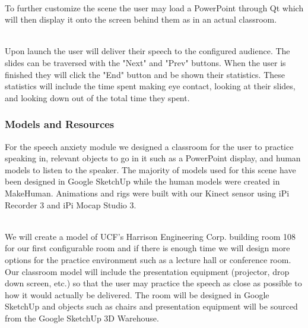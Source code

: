 \documentclass[a4paper,10pt]{article}
\begin{document}
\par~\\
To further customize the scene the user may load a PowerPoint through Qt which will then display it onto the screen behind them as in an actual classroom.

\par~\\
Upon launch the user will deliver their speech to the configured audience. The slides can be traversed with the "Next" and "Prev" buttons. When the user is finished they will click the "End" button and be shown their statistics. These statistics will include the time spent making eye contact, looking at their slides, and looking down out of the total time they spent.

\subsubsection{Models and Resources}
For the speech anxiety module we designed a classroom for the user to practice speaking in, relevant objects to go in it such as a PowerPoint display, and human models to listen to the speaker. The majority of models used for this scene have been designed in Google SketchUp while the human models were created in MakeHuman. Animations and rigs were built with our Kinect sensor using iPi Recorder 3 and iPi Mocap Studio 3.

\par~\\
We will create a model of UCF's Harrison Engineering Corp. building room 108 for our first configurable room and if there is enough time we will design more options for the practice environment such as a lecture hall or conference room. Our classroom model will include the presentation equipment (projector, drop down screen, etc.) so that the user may practice the speech as close as possible to how it would actually be delivered. The room will be designed in Google SketchUp and objects such as chairs and presentation equipment will be sourced from the Google SketchUp 3D Warehouse.
\end{document}
